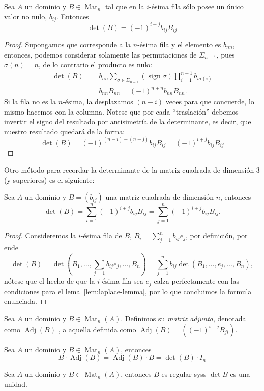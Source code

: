 \documentclass[11pt,oneside]{book}
\DeclareMathOperator{\Mat}{Mat}
\DeclareMathOperator{\sign}{sign}
\DeclareMathOperator{\Adj}{Adj}
\begin{document}
\begin{lem}\label{lem:laplace-lemma}
Sea $A$ un dominio y $B\in\Mat_n$ tal que en la $i$-ésima fila sólo posee un único valor no nulo, $b_{ij}$. Entonces
$$\det(B)=(-1)^{i+j}b_{ij}B_{ij}$$
\end{lem}
\begin{proof}
Supongamos que corresponde a la $n$-ésima fila y el elemento es $b_{nn}$, entonces, podemos considerar solamente las permutaciones de $\Sigma_{n-1}$, pues $\sigma(n)=n$, de lo contrario el producto es nulo:
\begin{align*}
\det(B)&=b_{nn}\sum_{\sigma\in\Sigma_{n-1}}(\sign\sigma)\prod_{i=1}^{n-1}b_{i\sigma(i)}\\
&=b_{nn}B_{nn}=(-1)^{n+n}b_{nn}B_{nn}.
\end{align*}
Si la fila no es la $n$-ésima, la desplazamos $(n-i)$ veces para que concuerde, lo mismo hacemos con la columna. Notese que por cada ``traslación'' debemos invertir el signo del resultado por antisimetría de la determinante, es decir, que nuestro resultado quedará de la forma:
$$\det(B)=(-1)^{(n-i)+(n-j)}b_{ij}B_{ij}=(-1)^{i+j}b_{ij}B_{ij}$$
\end{proof}
Otro método para recordar la determinante de la matriz cuadrada de dimensión 3 (y superiores) es el siguiente:
\begin{thm}
Sea $A$ un dominio y $B=(b_{ij})$ una matriz cuadrada de dimensión $n$, entonces
\begin{equation}
\det(B)=\sum_{i=1}^n(-1)^{i+j}b_{ij}B_{ij}=\sum_{j=1}^n(-1)^{i+j}b_{ij}B_{ij}.
\end{equation}
\end{thm}
\begin{proof}
Consideremos la $i$-ésima fila de $B$, $B_i=\sum_{j=1}^nb_{ij}e_j$, por definición, por ende
$$\det(B)=\det\left(B_1,\dots,\sum_{j=1}b_{ij}e_j,\dots,B_n\right)=\sum_{j=1}^nb_{ij}\det(B_1,\dots,e_j,\dots,B_n),$$
nótese que el hecho de que la $i$-ésima fila sea $e_j$ calza perfectamente con las condiciones para el lema~\ref{lem:laplace-lemma}, por lo que concluimos la formula enunciada.
\end{proof}
\begin{mydef}
Sea $A$ un dominio y $B\in\Mat_n(A)$. Definimos su \textit{matriz adjunta}, denotada como $\Adj(B)$ \nomenclature{$\Adj(B)$}{Matriz adjunta a $B$}, a aquella definida como $\Adj(B)=\left((-1)^{i+j}B_{ji}\right)$.
\end{mydef}
\begin{thm}
Sea $A$ un dominio y $B\in\Mat_n(A)$, entonces
$$B\cdot\Adj(B)=\Adj(B)\cdot B=\det(B)\cdot I_n$$
\end{thm}
\begin{cor}
Sea $A$ un dominio y $B\in\Mat_n(A)$, entonces $B$ es regular syss $\det B$ es una unidad.
\end{cor}
\end{document}

